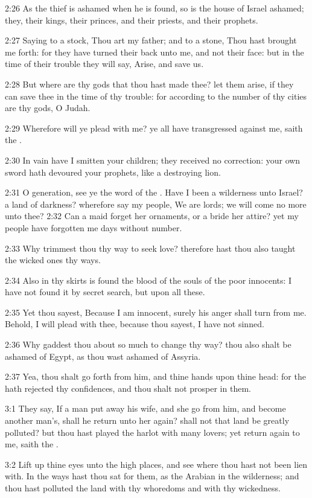 2:26 As the thief is ashamed when he is found, so is the house of Israel ashamed; they, their kings, their princes, and their priests, and their prophets.

2:27 Saying to a stock, Thou art my father; and to a stone, Thou hast brought me forth: for they have turned their back unto me, and not their face: but in the time of their trouble they will say, Arise, and save us.

2:28 But where are thy gods that thou hast made thee? let them arise, if they can save thee in the time of thy trouble: for according to the number of thy cities are thy gods, O Judah.

2:29 Wherefore will ye plead with me? ye all have transgressed against me, saith the \LORD.

2:30 In vain have I smitten your children; they received no correction: your own sword hath devoured your prophets, like a destroying lion.

2:31 O generation, see ye the word of the \LORD. Have I been a wilderness unto Israel? a land of darkness? wherefore say my people, We are lords; we will come no more unto thee?  2:32 Can a maid forget her ornaments, or a bride her attire? yet my people have forgotten me days without number.

2:33 Why trimmest thou thy way to seek love? therefore hast thou also taught the wicked ones thy ways.

2:34 Also in thy skirts is found the blood of the souls of the poor innocents: I have not found it by secret search, but upon all these.

2:35 Yet thou sayest, Because I am innocent, surely his anger shall turn from me. Behold, I will plead with thee, because thou sayest, I have not sinned.

2:36 Why gaddest thou about so much to change thy way? thou also shalt be ashamed of Egypt, as thou wast ashamed of Assyria.

2:37 Yea, thou shalt go forth from him, and thine hands upon thine head: for the \LORD hath rejected thy confidences, and thou shalt not prosper in them.

3:1 They say, If a man put away his wife, and she go from him, and become another man's, shall he return unto her again? shall not that land be greatly polluted? but thou hast played the harlot with many lovers; yet return again to me, saith the \LORD.

3:2 Lift up thine eyes unto the high places, and see where thou hast not been lien with. In the ways hast thou sat for them, as the Arabian in the wilderness; and thou hast polluted the land with thy whoredoms and with thy wickedness.

